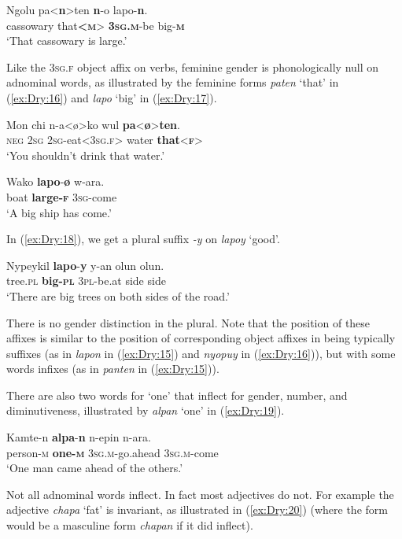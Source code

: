 \documentclass[output=collectionpaper]{langsci/langscibook}
\begin{document}
\ea  \label{ex:Dry:15}
\gll Ngolu	pa<\textbf{n}>ten	\textbf{n}-o	lapo-\textbf{n}.\\
cassowary that\textbf{<\textsc{m}}> \textbf{\textsc{3sg.m}}-be big-\textbf{\textsc{m}}\\
\glt `That cassowary is large.'
\z

Like the \textsc{3sg.f} object affix on verbs, feminine gender is phonologically null on adnominal words, as illustrated by the feminine forms \textit{paten} `that' in (\ref{ex:Dry:16}) and \textit{lapo} `big' in (\ref{ex:Dry:17}).

\ea \label{ex:Dry:16}
\gll Mon	chi	n-a<ø>ko	wul	\textbf{pa}<\textbf{ø}>\textbf{ten}.\\
\textsc{neg} \textsc{2sg} \textsc{2sg}-eat<\textsc{3sg.f}> water \textbf{that}<\textbf{\textsc{f}}>\\
\glt `You shouldn't drink that water.'
\z

\ea \label{ex:Dry:17}
\gll Wako	\textbf{lapo}-\textbf{ø}	w-ara.\\
boat \textbf{large-\textsc{f}} \textsc{3sg}-come\\
\glt `A big ship has come.'
\z

In (\ref{ex:Dry:18}), we get a plural suffix \textit{-y} on \textit{lapoy} `good'.

\ea  \label{ex:Dry:18}
\gll Nypeykil	\textbf{lapo}-\textbf{y}	y-an	olun	olun. \\
tree.\textsc{pl} \textbf{big-\textsc{pl}} \textsc{3pl}-be.at side side\\
\glt  `There are big trees on both sides of the road.'
\z

There is no gender distinction in the plural. Note that the position of these affixes is similar to the position of corresponding object affixes in being typically suffixes (as in \textit{lapon} in (\ref{ex:Dry:15}) and \textit{nyopuy} in (\ref{ex:Dry:16})), but with some words infixes (as in \textit{panten} in (\ref{ex:Dry:15})).

There are also two words for `one' that inflect for gender, number, and diminutiveness, illustrated by \textit{alpan} `one' in (\ref{ex:Dry:19}).

\ea  \label{ex:Dry:19}
\gll Kamte-n	\textbf{alpa}-\textbf{n}	n-epin	n-ara.\\
person-\textsc{m} \textbf{one-\textsc{m}} \textsc{3sg.m}-go.ahead \textsc{3sg.m}-come\\
\glt `One man came ahead of the others.'
\z

  Not all adnominal words inflect. In fact most adjectives do not. For example the adjective \textit{chapa} `fat' is invariant, as illustrated in (\ref{ex:Dry:20}) (where the form would be a masculine form \textit{chapan} if it did inflect).
\end{document}
